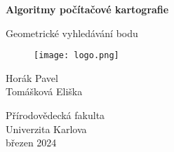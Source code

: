 \begin{titlepage}
    \begin{center}
        \vspace*{1cm}
        
        \Huge
          \textbf{Algoritmy počítačové kartografie} 
        
        \vspace{0.5cm}
        \LARGE
        Geometrické vyhledávání bodu
        
        \vspace{1.5cm}        
               
        
       \begin{figure}[h]
           \centering
           \texttt{[image: logo.png]}
           
           
       \end{figure}
        
        \vspace{3cm}   
        Horák Pavel \\ Tomášková Eliška
        
        \vspace{3cm}
          \Large
        Přírodovědecká fakulta\\
        Univerzita Karlova\\
        \vspace{0.8cm}
        březen 2024
        \vspace{0.5cm}
       
        
    \end{center}
\end{titlepage}